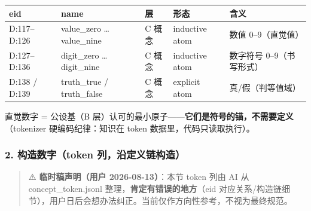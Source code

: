 \documentclass[
]{article}
\newcounter{none} %
\begin{document}
{\def\LTcaptype{none} %
\begin{longtable}[]{@{}
  >{\raggedright\arraybackslash}p{}
  >{\raggedright\arraybackslash}p{}
  >{\raggedright\arraybackslash}p{}
  >{\raggedright\arraybackslash}p{}
  >{\raggedright\arraybackslash}p{}@{}}
\toprule\noalign{}
\begin{minipage}[b]{\linewidth}\raggedright
eid
\end{minipage} & \begin{minipage}[b]{\linewidth}\raggedright
name
\end{minipage} & \begin{minipage}[b]{\linewidth}\raggedright
层
\end{minipage} & \begin{minipage}[b]{\linewidth}\raggedright
形态
\end{minipage} & \begin{minipage}[b]{\linewidth}\raggedright
含义
\end{minipage} \\
\midrule\noalign{}
\endhead
\bottomrule\noalign{}
\endlastfoot
D:117--D:126 & value\_zero \ldots{} value\_nine & C 概念 & inductive
atom & 数值 0--9（直觉值） \\
D:127--D:136 & digit\_zero \ldots{} digit\_nine & C 概念 & inductive
atom & 数字符号 0--9（书写形式） \\
D:138 / D:139 & truth\_true / truth\_false & C 概念 & explicit atom &
真/假（判等值域） \\
\end{longtable}
}

直觉数字 = 公设基（B
层）认可的最小原子------\textbf{它们是符号的锚，不需要定义}（tokenizer
硬编码纪律：知识在 token 数据里，代码只读取执行）。

\subsubsection{2. 构造数字（token
列，沿定义链构造）}\label{ux6784ux9020ux6570ux5b57token-ux5217ux6cbfux5b9aux4e49ux94feux6784ux9020}

\begin{quote}
⚠️ \textbf{临时稿声明（用户 2026-08-13）}：本节 token 列由 AI 从
concept\_token.jsonl 整理，\textbf{肯定有错误的地方}（eid
对应关系/构造链细节），用户日后会想办法纠正。当前仅作方向性参考，不视为最终规范。
\end{quote}
\end{document}
